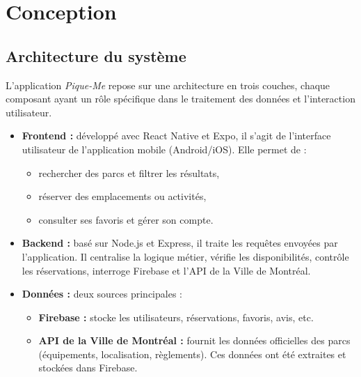 \documentclass[12pt,a4paper]{article}
\begin{document}
\section{Conception}

\subsection{Architecture du système}

L'application \textit{Pique-Me} repose sur une architecture en trois couches, chaque composant ayant un rôle spécifique dans le traitement des données et l'interaction utilisateur.

\begin{itemize}
  \item \textbf{Frontend :} développé avec React Native et Expo, il s'agit de l'interface utilisateur de l'application mobile (Android/iOS). Elle permet de :
  \begin{itemize}
    \item rechercher des parcs et filtrer les résultats,
    \item réserver des emplacements ou activités,
    \item consulter ses favoris et gérer son compte.
  \end{itemize}

  \item \textbf{Backend :} basé sur Node.js et Express, il traite les requêtes envoyées par l'application. Il centralise la logique métier, vérifie les disponibilités, contrôle les réservations, interroge Firebase et l'API de la Ville de Montréal.

  \item \textbf{Données :} deux sources principales :
  \begin{itemize}
    \item \textbf{Firebase :} stocke les utilisateurs, réservations, favoris, avis, etc.
    \item \textbf{API de la Ville de Montréal :} fournit les données officielles des parcs (équipements, localisation, règlements). Ces données ont été extraites et stockées dans Firebase.
  \end{itemize}
\end{itemize}
\end{document}
